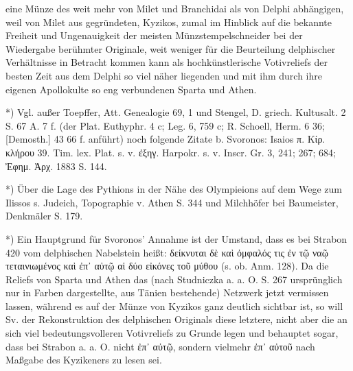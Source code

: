 \documentclass[a4paper, 11pt, oneside]{article}
\begin{document}
eine Münze des weit mehr von Milet und Branchidai als von Delphi abhängigen, weil von Milet aus gegründeten, Kyzikos, zumal im Hinblick auf die bekannte Freiheit und Ungenauigkeit der meisten Münzstempelschneider bei der Wiedergabe berühmter Originale, weit weniger für die Beurteilung delphischer Verhältnisse in Betracht kommen kann als hochkünstlerische Votivreliefs der besten Zeit aus dem Delphi so viel näher liegenden und mit ihm durch ihre eigenen Apollokulte so eng verbundenen Sparta und Athen.

*) Vgl. außer Toepffer, Att. Genealogie 69, 1 und Stengel, D. griech. Kultusalt. 2 S. 67 A. 7 f. (der Plat. Euthyphr. 4 c; Leg. 6, 759 c; R. Schoell, Herm. 6 36; [Demosth.] 43 66 f. anführt) noch folgende Zitate b. Svoronos: Isaios π. Κίρ. κλήρου 39. Tim. lex. Plat. s. v. ἐξηγ. Harpokr. s. v. Inscr. Gr. 3, 241; 267; 684; Ἐφημ. Ἀρχ. 1883 S. 144.

*) Über die Lage des Pythions in der Nähe des Olympieions auf dem Wege zum Ilissos s. Judeich, Topographie v. Athen S. 344 und Milchhöfer bei Baumeister, Denkmäler S. 179.

*) Ein Hauptgrund für Svoronos' Annahme ist der Umstand, dass es bei Strabon 420 vom delphischen Nabelstein heißt: δείκνυται δὲ καὶ ὀμφαλός τις ἐν τῷ ναῷ τεταινιωμένος καὶ ἐπ᾿ αὐτῷ αἱ δύο εἰκόνες τοῦ μύθου (s. ob. Anm. 128). Da die Reliefs von Sparta und Athen das (nach Studniczka a. a. O. S. 267 ursprünglich nur in Farben dargestellte, aus Tänien bestehende) Netzwerk jetzt vermissen lassen, während es auf der Münze von Kyzikos ganz deutlich sichtbar ist, so will Sv. der Rekonstruktion des delphischen Originals diese letztere, nicht aber die an sich viel bedeutungsvolleren Votivreliefs zu Grunde legen und behauptet sogar, dass bei Strabon a. a. O. nicht ἐπ᾽ αὐτῷ, sondern vielmehr ἐπ᾽ αὐτοῦ nach Maßgabe des Kyzikeners zu lesen sei.
\end{document}
